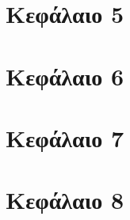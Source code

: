 \documentclass[a4paper,11pt,twoside,openright]{report}
\begin{document}
\chapter{Κεφάλαιο 5}\label{ch:chap5}


\chapter{Κεφάλαιο 6}\label{ch:chap6}


\chapter{Κεφάλαιο 7}\label{ch:chap7}


\chapter{Κεφάλαιο 8}\label{ch:chap8}


\newblankpage
\cleardoublepage
{}

\nocite{*}
\printbibliography
{}
\newblankpage


\end{document}
